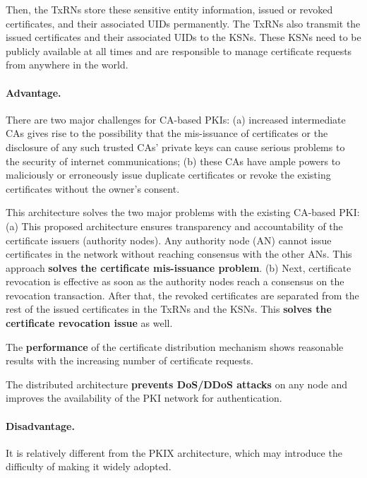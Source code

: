 \documentclass[lang=en]{sjtuarticle}
\begin{document}
Then, the TxRNs store these sensitive entity information, issued or revoked
certificates, and their associated UIDs permanently. The TxRNs also transmit
the issued certificates and their associated UIDs to the KSNs. These KSNs need to be
publicly available at all times and are responsible to manage certificate requests
from anywhere in the world.

\paragraph{Advantage.} There are two major challenges for CA-based PKIs: (a) increased intermediate CAs gives
rise to the possibility that the mis-issuance of certificates or the disclosure of
any such trusted CAs' private keys can cause serious problems to the security
of internet communications; (b) these CAs have ample powers to maliciously or erroneously issue
duplicate certificates or revoke the existing certificates without the owner's consent.

This architecture solves the two major problems with the existing CA-based
PKI:
(a) This proposed architecture ensures
transparency and accountability of the certificate issuers (authority nodes). Any
authority node (AN) cannot issue certificates in the network without reaching
consensus with the other ANs. This approach \textbf{solves the certificate mis-issuance
problem}. (b) Next, certificate revocation is effective as soon as the authority nodes
reach a consensus on the revocation transaction. After that, the revoked certificates
are separated from the rest of the issued certificates in the TxRNs and the
KSNs. This \textbf{solves the certificate revocation issue} as well.

The \textbf{performance} of the certificate distribution mechanism
shows reasonable results with the increasing number of certificate requests. 

The distributed architecture
\textbf{prevents DoS/DDoS attacks} on any node and improves the availability of the
PKI network for authentication.


\paragraph{Disadvantage.} It is relatively different from the PKIX architecture, which may introduce the difficulty of making it widely adopted.

\printbibliography
\end{document}
